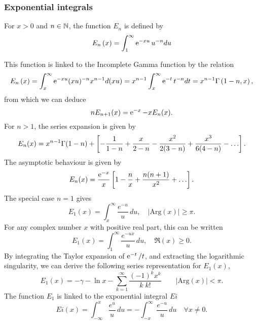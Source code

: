 \subsubsection{Exponential integrals}
For $x>0$ and $n \in {\mathbb N}$, the  function $E_n$ is defined by
\begin{equation*}
  E_n\left( x \right)=\int_{1}^{\infty} \operatorname{e}^{ -x u } u^{-n} du
\end{equation*}

This function is linked to the Incomplete Gamma function by the relation
\begin{equation*}
  E_n\left( x \right)=\int_{x}^{\infty}
  \operatorname{e}^{ -xu } (xu)^{-n} x^{n-1} d(xu)=x^{n-1} \int_{x}^{\infty}
  \operatorname{e}^{ -t } t^{-n} dt =  x^{n-1}  \Gamma\left( 1-n, x \right), 
\end{equation*}
from which we can deduce
\begin{equation*}
  n E_{n+1}(x)  =   \operatorname{e}^{ -x } - x E_n(x).
\end{equation*}
For $n>1$, the series expansion is given by
\begin{equation*}
  E_n(x)=x^{n-1}
  \Gamma(1-n)+\recaco{-\frac{1}{1-n}+\frac{x}{2-n}-\frac{x^2}{2(3-n)}
    +\frac{x^3}{6(4-n)}-\dots}.     
\end{equation*}
The asymptotic behaviour is given by
\begin{equation*}
  E_n(x)=\frac{\expp{-x}}{x}\recaco{1-\frac{n}{x}+\frac{n(n+1)}{x^2}+\dots}. 
\end{equation*}
The special case $n=1$ gives 
\begin{equation*}
  E_1(x) = \int_x^\infty \frac{e^{-u}}{u}\, du, \quad |\mathrm{Arg}(x)| \ge \pi. 
\end{equation*}
For any complex number $x$ with positive real part, this can be written
\begin{equation*}
  E_1(x) = \int_1^\infty \frac{e^{-ux}}{u}\, du, \quad \Re(x) \ge 0. 
\end{equation*}
By integrating the Taylor expansion of $\operatorname{e}^{ -t }/t$, and extracting the
logarithmic singularity, we can derive the following series representation for
$E_1(x)$, 
\begin{equation*}
  {E_1}(x) =-\gamma-\ln x-\sum_{k=1}^{\infty}\frac{(-1)^k x^k}{k\; k!}
  \qquad |\mathrm{Arg}(x)| < \pi. 
\end{equation*}
The function $E_1$ is linked to the exponential integral $Ei$
\begin{equation*}
  Ei(x)=\int_{-\infty}^x\frac{e^u}u\, du=-\int_{-x}^{\infty}
  \frac{e^{-u}}{u}\, du \quad \forall x \neq 0. 
\end{equation*}
